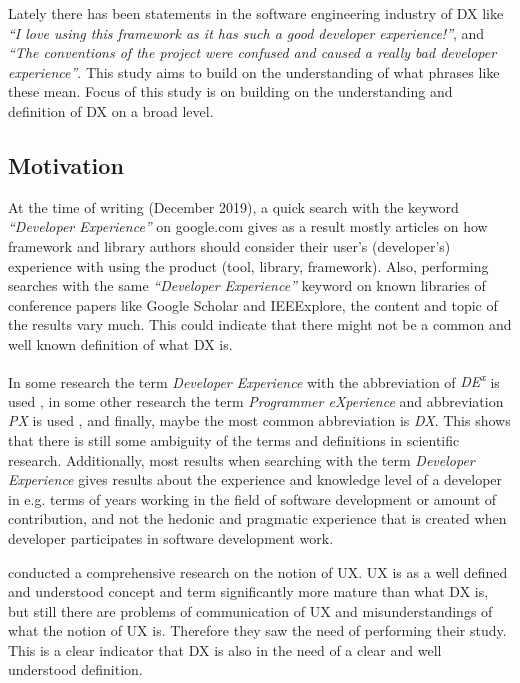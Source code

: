 \documentclass[english, 12pt, a4paper, sci, utf8, a-1b, online]{aaltothesis}
\newcommand{\now}{December 2019}
\begin{document}
Lately there has been statements in the software engineering industry of DX like \textit{``I love using this framework as it has such a good developer experience!''}, and \textit{``The conventions of the project were confused and caused a really bad developer experience''}. This study aims to build on the understanding of what phrases like these mean. Focus of this study is on building on the understanding  and definition of DX on a broad level.

\thispagestyle{empty}

\subsection{Motivation} \label{section:motivation}

At the time of writing (\now), a quick search with the keyword \textit{``Developer Experience''} on google.com gives as a result mostly articles on how framework and library authors should consider their user's (developer's) experience with using the product (tool, library, framework). Also, performing searches with the same \textit{``Developer Experience''} keyword on known libraries of conference papers like Google Scholar and IEEExplore, the content and topic of the results vary much. This could indicate that there might not be a common and well known definition of what DX is.

In some research the term \textit{Developer Experience} with the abbreviation of \textit{DE\textsuperscript{x}} is used \parencite{fagerholm-dx-concept-and-definition}, in some other research the term \textit{Programmer eXperience} and abbreviation \textit{PX} is used \parencite{programmer-experience}, and finally, maybe the most common abbreviation is \textit{DX}. This shows that there is still some ambiguity of the terms and definitions in scientific research. Additionally, most results when searching with the term \textit{Developer Experience} gives results about the experience and knowledge level of a developer in e.g. terms of years working in the field of software development or amount of contribution, and not the hedonic and pragmatic experience that is created when developer participates in software development work.

\textcite{understanding-ux} conducted a comprehensive research on the notion of UX. UX is as a well defined and understood concept and term significantly more mature than what DX is, but still there are problems of communication of UX and misunderstandings of what the notion of UX is. Therefore they saw the need of performing their study. This is a clear indicator that DX is also in the need of a clear and well understood definition.
\end{document}
